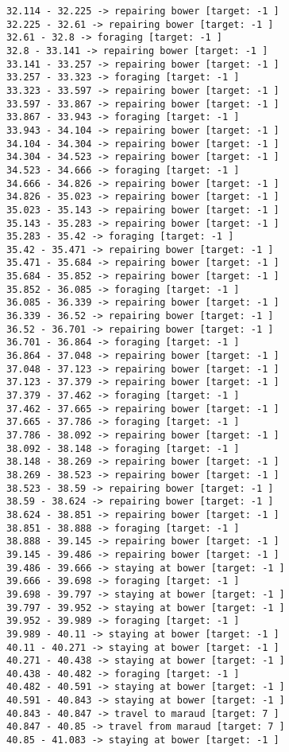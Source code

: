 \documentclass[11pt]{article}
\begin{document}
\begin{Verbatim}[commandchars=\\\{\}]
32.114 - 32.225 -> repairing bower [target: -1 ]
32.225 - 32.61 -> repairing bower [target: -1 ]
32.61 - 32.8 -> foraging [target: -1 ]
32.8 - 33.141 -> repairing bower [target: -1 ]
33.141 - 33.257 -> repairing bower [target: -1 ]
33.257 - 33.323 -> foraging [target: -1 ]
33.323 - 33.597 -> repairing bower [target: -1 ]
33.597 - 33.867 -> repairing bower [target: -1 ]
33.867 - 33.943 -> foraging [target: -1 ]
33.943 - 34.104 -> repairing bower [target: -1 ]
34.104 - 34.304 -> repairing bower [target: -1 ]
34.304 - 34.523 -> repairing bower [target: -1 ]
34.523 - 34.666 -> foraging [target: -1 ]
34.666 - 34.826 -> repairing bower [target: -1 ]
34.826 - 35.023 -> repairing bower [target: -1 ]
35.023 - 35.143 -> repairing bower [target: -1 ]
35.143 - 35.283 -> repairing bower [target: -1 ]
35.283 - 35.42 -> foraging [target: -1 ]
35.42 - 35.471 -> repairing bower [target: -1 ]
35.471 - 35.684 -> repairing bower [target: -1 ]
35.684 - 35.852 -> repairing bower [target: -1 ]
35.852 - 36.085 -> foraging [target: -1 ]
36.085 - 36.339 -> repairing bower [target: -1 ]
36.339 - 36.52 -> repairing bower [target: -1 ]
36.52 - 36.701 -> repairing bower [target: -1 ]
36.701 - 36.864 -> foraging [target: -1 ]
36.864 - 37.048 -> repairing bower [target: -1 ]
37.048 - 37.123 -> repairing bower [target: -1 ]
37.123 - 37.379 -> repairing bower [target: -1 ]
37.379 - 37.462 -> foraging [target: -1 ]
37.462 - 37.665 -> repairing bower [target: -1 ]
37.665 - 37.786 -> foraging [target: -1 ]
37.786 - 38.092 -> repairing bower [target: -1 ]
38.092 - 38.148 -> foraging [target: -1 ]
38.148 - 38.269 -> repairing bower [target: -1 ]
38.269 - 38.523 -> repairing bower [target: -1 ]
38.523 - 38.59 -> repairing bower [target: -1 ]
38.59 - 38.624 -> repairing bower [target: -1 ]
38.624 - 38.851 -> repairing bower [target: -1 ]
38.851 - 38.888 -> foraging [target: -1 ]
38.888 - 39.145 -> repairing bower [target: -1 ]
39.145 - 39.486 -> repairing bower [target: -1 ]
39.486 - 39.666 -> staying at bower [target: -1 ]
39.666 - 39.698 -> foraging [target: -1 ]
39.698 - 39.797 -> staying at bower [target: -1 ]
39.797 - 39.952 -> staying at bower [target: -1 ]
39.952 - 39.989 -> foraging [target: -1 ]
39.989 - 40.11 -> staying at bower [target: -1 ]
40.11 - 40.271 -> staying at bower [target: -1 ]
40.271 - 40.438 -> staying at bower [target: -1 ]
40.438 - 40.482 -> foraging [target: -1 ]
40.482 - 40.591 -> staying at bower [target: -1 ]
40.591 - 40.843 -> staying at bower [target: -1 ]
40.843 - 40.847 -> travel to maraud [target: 7 ]
40.847 - 40.85 -> travel from maraud [target: 7 ]
40.85 - 41.083 -> staying at bower [target: -1 ]

\end{Verbatim}
\end{document}
